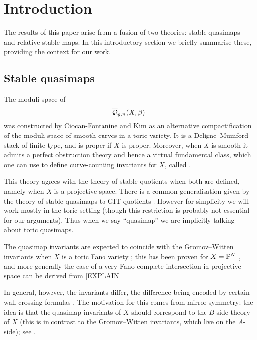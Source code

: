 \section{Introduction}
The results of this paper arise from a fusion of two theories: stable quasimaps and relative stable maps. In this introductory section we briefly summarise these, providing the context for our work.

\subsection{Stable quasimaps}
The moduli space of 
\begin{equation*} \overline{\mathcal Q}_{g,n}(X,\beta) \end{equation*}
was constructed by Ciocan-Fontanine and Kim \cite{CF-K} as an alternative compactification of the moduli space of smooth curves in a toric variety. It is a Deligne--Mumford stack of finite type, and is proper if $X$ is proper. Moreover, when $X$ is smooth it admits a perfect obstruction theory and hence a virtual fundamental class, which one can use to define curve-counting invariants for $X$, called .

This theory agrees with the theory of stable quotients \cite{MOP} when both are defined, namely when $X$ is a projective space.  There is a common generalisation given by the theory of stable quasimaps to GIT quotients \cite{CFKM}. However for simplicity we will work mostly in the toric setting (though this restriction is probably not essential for our arguments). Thus when we say ``quasimap'' we are implicitly talking about toric quasimaps.

The quasimap invariants are expected to coincide with the Gromov--Witten invariants when $X$ is a toric Fano variety \cite{CM}; this has been proven for $X=\mathbb P^N$ \cite{MOP} \cite[\S 5.4]{Manolache-Push}, and more generally the case of a very Fano complete intersection in projective space can be derived from [EXPLAIN] 

In general, however, the invariants differ, the difference being encoded by certain wall-crossing formulas \cite{CF-K-wallcrossing}. The motivation for this comes from mirror symmetry: the idea is that the quasimap invariants of $X$ should correspond to the $B$-side theory of $X$ (this is in contrast to the Gromov--Witten invariants, which live on the $A$-side); see \cite[\S 7]{CF-K}. 

